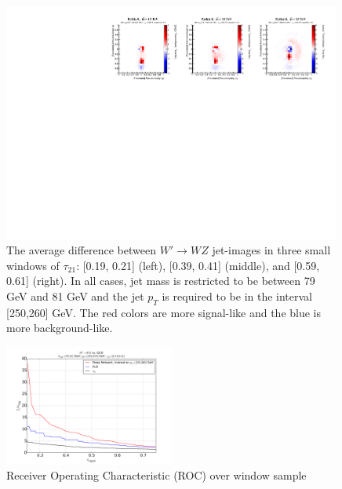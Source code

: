 \begin{figure}[h!]
  \begin{center}
  
        \includegraphics[width=0.99\textwidth]{figures/difference_fixed_nonorm.pdf}
        
      \caption{
         The average difference between $W'\rightarrow WZ$ jet-images in three small windows of $\tau_{21}$: [0.19, 0.21] (left), [0.39, 0.41] (middle), and [0.59, 0.61] (right).  In all cases, jet mass is restricted to be between 79 GeV and 81 GeV and the jet $p_T$ is required to be in the interval [250,260] GeV.  The red colors are more signal-like and the blue is more background-like.
        \label{fig:meanImagesWindow2} 
      }
    \end{center}
\end{figure}  

\begin{figure}[h!]
  \centering
  \includegraphics[width=0.5\textwidth]{figures/augwindow-roc.pdf}
  \caption{Receiver Operating Characteristic (ROC) over window sample}
  \label{fig:rocWindow}
\end{figure}


